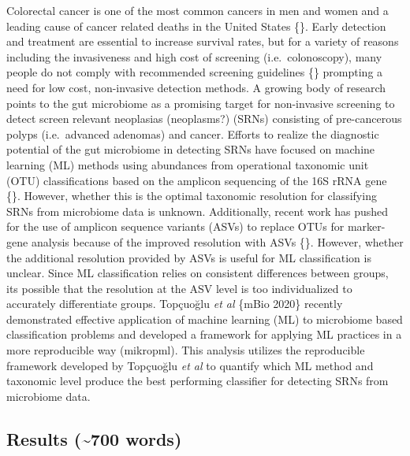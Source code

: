 \documentclass[
]{article}
\begin{document}
Colorectal cancer is one of the most common cancers in men and women and
a leading cause of cancer related deaths in the United States \{\}.
Early detection and treatment are essential to increase survival rates,
but for a variety of reasons including the invasiveness and high cost of
screening (i.e.~colonoscopy), many people do not comply with recommended
screening guidelines \{\} prompting a need for low cost, non-invasive
detection methods. A growing body of research points to the gut
microbiome as a promising target for non-invasive screening to detect
screen relevant neoplasias (neoplasms?) (SRNs) consisting of
pre-cancerous polyps (i.e.~advanced adenomas) and cancer. Efforts to
realize the diagnostic potential of the gut microbiome in detecting SRNs
have focused on machine learning (ML) methods using abundances from
operational taxonomic unit (OTU) classifications based on the amplicon
sequencing of the 16S rRNA gene \{\}. However, whether this is the
optimal taxonomic resolution for classifying SRNs from microbiome data
is unknown. Additionally, recent work has pushed for the use of amplicon
sequence variants (ASVs) to replace OTUs for marker-gene analysis
because of the improved resolution with ASVs \{\}. However, whether the
additional resolution provided by ASVs is useful for ML classification
is unclear. Since ML classification relies on consistent differences
between groups, its possible that the resolution at the ASV level is too
individualized to accurately differentiate groups. Topçuoğlu \emph{et
al} \{mBio 2020\} recently demonstrated effective application of machine
learning (ML) to microbiome based classification problems and developed
a framework for applying ML practices in a more reproducible way
(mikropml). This analysis utilizes the reproducible framework developed
by Topçuoğlu \emph{et al} to quantify which ML method and taxonomic
level produce the best performing classifier for detecting SRNs from
microbiome data.

\hypertarget{results-700-words}{%
\subsection{Results (\textasciitilde700
words)}\label{results-700-words}}
\end{document}
